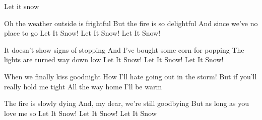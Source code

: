 \begin{sang}{Let it snow}{}
\begin{vers}
Oh the weather outside is frightful
But the fire is so delightful
And since we've no place to go
Let It Snow! Let It Snow! Let It Snow!
\end{vers}
\begin{vers}
It doesn't show signs of stopping
And I've bought some corn for popping
The lights are turned way down low
Let It Snow! Let It Snow! Let It Snow!
\end{vers}
\vbox{}\vfill
\begin{vers}
When we finally kiss goodnight
How I'll hate going out in the storm!
But if you'll really hold me tight
All the way home I'll be warm
\end{vers}
\begin{vers}
The fire is slowly dying
And, my dear, we're still goodbying
But as long as you love me so
Let It Snow! Let It Snow! Let It Snow
\end{vers}
\laps
\end{sang}